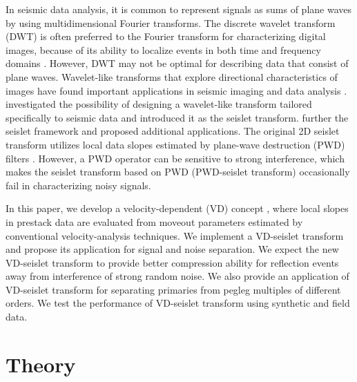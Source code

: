 In seismic data analysis, it is common to represent signals as sums of
plane waves by using multidimensional Fourier
transforms. The discrete
wavelet transform (DWT) is often preferred to the Fourier transform
for characterizing digital images, because of its ability to localize
events in both time and frequency domains
\cite[]{ripples,mallat}. However, DWT may not be optimal for
describing data that consist of plane waves. Wavelet-like transforms
that explore directional characteristics of images have found
important applications in seismic imaging and data
analysis \cite[]{Chauris08,Herrmann08b}. \cite{Fomel06} investigated
the possibility of designing a wavelet-like transform tailored
specifically to seismic data and introduced it as the seislet
transform. \cite{Fomel10a} further   the seislet framework and
proposed additional applications. The original 2D seislet transform
utilizes local data slopes estimated by plane-wave destruction (PWD)
filters \cite[]{Fomel02,Chen13a,Chen13b}. However, a PWD operator can
be sensitive to strong interference, which makes the seislet transform
based on PWD (PWD-seislet transform) occasionally fail in
characterizing noisy signals.

In this paper, we develop a velocity-dependent (VD) concept
\cite[]{Liu13}, where local slopes in prestack data are evaluated from
moveout parameters estimated by conventional velocity-analysis
techniques. We implement a VD-seislet transform and propose its
application for signal and noise separation. We expect the new
VD-seislet transform to provide better compression ability for
reflection events away from interference of strong random noise. We
also provide an application of VD-seislet transform for separating
primaries from pegleg multiples of different orders. We test the
performance of VD-seislet transform using synthetic and field data.

\section{Theory}

